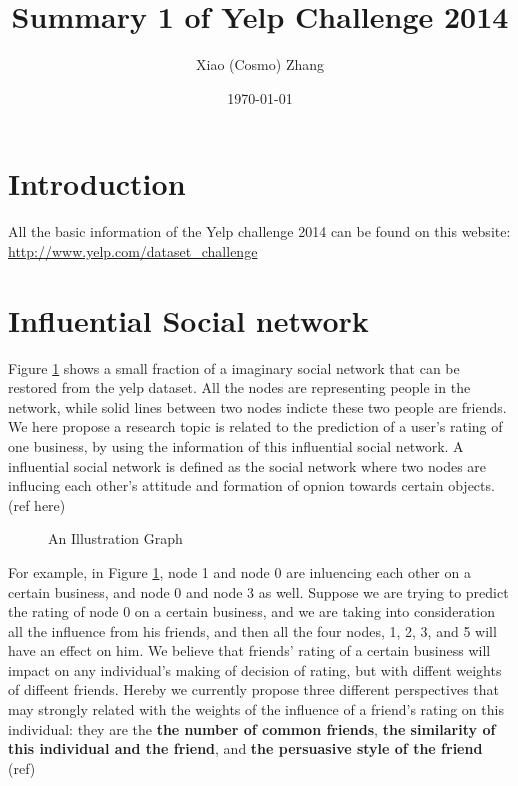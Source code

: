 \documentclass[11pt]{article} %
\title{Summary 1 of Yelp Challenge 2014}
\author{Xiao (Cosmo) Zhang}
\date{\today} %
\newcommand{\1}{{\bf 1}}
\newcommand{\0}{{\bf 0}}
\begin{document}
\maketitle
\tableofcontents

\newpage
\section{Introduction}
All the basic information of the Yelp challenge 2014 can be found on this website: \url{http://www.yelp.com/dataset_challenge}

\section{Influential Social network}
Figure \ref{grh} shows a small fraction of a imaginary social network that can be restored from the yelp dataset. All the nodes are representing people in the network, while solid lines between two nodes indicte these two people are friends. We here propose a research topic is related to the prediction of a user's rating of one business, by using the information of this influential social network. A influential social network is defined as the social network where two nodes are influcing each other's attitude and formation of opnion towards certain objects. (ref here)
\begin{figure}[htb!]
\centering
{}
\caption{An Illustration Graph}
\label{grh}	
\end{figure}

For example, in Figure \ref{grh}, node 1 and node 0 are inluencing each other on a certain business, and node 0 and node 3 as well. Suppose we are trying to predict the rating of node 0 on a certain business, and we are taking into consideration all the influence from his friends, and then all the four nodes, 1, 2, 3, and 5 will have an effect on him. We believe that friends' rating of a certain business will impact on any individual's making of decision of rating, but with diffent weights of diffeent friends. Hereby we currently propose three different perspectives that may strongly related with the weights of the influence of a friend's rating on this individual: they are the \textbf{the number of common friends}, \textbf{the similarity of this individual and the friend}, and \textbf{the persuasive style of the friend} (ref)
\end{document}
